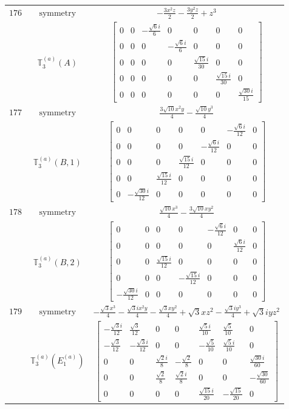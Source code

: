 \documentclass[fleqn,8pt,landscape]{jsarticle}
\begin{document}
\begin{longtable}{ccc}
$ 176 $ & $ \text{symmetry} $ & $ - \frac{3 x^{2} z}{2} - \frac{3 y^{2} z}{2} + z^{3} $ \\
$  $ & $ \mathbb{T}_{3}^{(a)}(A) $ & $ \begin{bmatrix} 0 & 0 & - \frac{\sqrt{6} i}{6} & 0 & 0 & 0 & 0 \\ 0 & 0 & 0 & - \frac{\sqrt{6} i}{6} & 0 & 0 & 0 \\ 0 & 0 & 0 & 0 & \frac{\sqrt{15} i}{30} & 0 & 0 \\ 0 & 0 & 0 & 0 & 0 & \frac{\sqrt{15} i}{30} & 0 \\ 0 & 0 & 0 & 0 & 0 & 0 & \frac{\sqrt{30} i}{15} \end{bmatrix} $ \\ \hline
$ 177 $ & $ \text{symmetry} $ & $ \frac{3 \sqrt{10} x^{2} y}{4} - \frac{\sqrt{10} y^{3}}{4} $ \\
$  $ & $ \mathbb{T}_{3}^{(a)}(B,1) $ & $ \begin{bmatrix} 0 & 0 & 0 & 0 & 0 & - \frac{\sqrt{6} i}{12} & 0 \\ 0 & 0 & 0 & 0 & - \frac{\sqrt{6} i}{12} & 0 & 0 \\ 0 & 0 & 0 & \frac{\sqrt{15} i}{12} & 0 & 0 & 0 \\ 0 & 0 & \frac{\sqrt{15} i}{12} & 0 & 0 & 0 & 0 \\ 0 & - \frac{\sqrt{30} i}{12} & 0 & 0 & 0 & 0 & 0 \end{bmatrix} $ \\ \hline
$ 178 $ & $ \text{symmetry} $ & $ \frac{\sqrt{10} x^{3}}{4} - \frac{3 \sqrt{10} x y^{2}}{4} $ \\
$  $ & $ \mathbb{T}_{3}^{(a)}(B,2) $ & $ \begin{bmatrix} 0 & 0 & 0 & 0 & - \frac{\sqrt{6} i}{12} & 0 & 0 \\ 0 & 0 & 0 & 0 & 0 & \frac{\sqrt{6} i}{12} & 0 \\ 0 & 0 & \frac{\sqrt{15} i}{12} & 0 & 0 & 0 & 0 \\ 0 & 0 & 0 & - \frac{\sqrt{15} i}{12} & 0 & 0 & 0 \\ - \frac{\sqrt{30} i}{12} & 0 & 0 & 0 & 0 & 0 & 0 \end{bmatrix} $ \\ \hline
$ 179 $ & $ \text{symmetry} $ & $ - \frac{\sqrt{3} x^{3}}{4} - \frac{\sqrt{3} i x^{2} y}{4} - \frac{\sqrt{3} x y^{2}}{4} + \sqrt{3} x z^{2} - \frac{\sqrt{3} i y^{3}}{4} + \sqrt{3} i y z^{2} $ \\
$  $ & $ \mathbb{T}_{3}^{(a)}(E_{1}^{(a)}) $ & $ \begin{bmatrix} - \frac{\sqrt{3} i}{12} & \frac{\sqrt{3}}{12} & 0 & 0 & \frac{\sqrt{5} i}{10} & \frac{\sqrt{5}}{10} & 0 \\ - \frac{\sqrt{3}}{12} & - \frac{\sqrt{3} i}{12} & 0 & 0 & - \frac{\sqrt{5}}{10} & \frac{\sqrt{5} i}{10} & 0 \\ 0 & 0 & \frac{\sqrt{2} i}{8} & - \frac{\sqrt{2}}{8} & 0 & 0 & \frac{\sqrt{30} i}{60} \\ 0 & 0 & \frac{\sqrt{2}}{8} & \frac{\sqrt{2} i}{8} & 0 & 0 & - \frac{\sqrt{30}}{60} \\ 0 & 0 & 0 & 0 & \frac{\sqrt{15} i}{20} & - \frac{\sqrt{15}}{20} & 0 \end{bmatrix} $ \\ \hline

\end{longtable}
\end{document}
